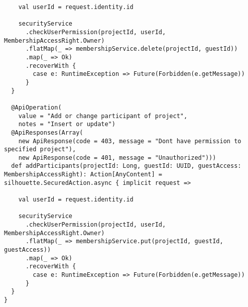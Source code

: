 \begin{lstlisting}
    val userId = request.identity.id

    securityService
      .checkUserPermission(projectId, userId, MembershipAccessRight.Owner)
      .flatMap(_ => membershipService.delete(projectId, guestId))
      .map(_ => Ok)
      .recoverWith {
        case e: RuntimeException => Future(Forbidden(e.getMessage))
      }
  }

  @ApiOperation(
    value = "Add or change participant of project",
    notes = "Insert or update")
  @ApiResponses(Array(
    new ApiResponse(code = 403, message = "Dont have permission to specified project"),
    new ApiResponse(code = 401, message = "Unauthorized")))
  def addParticipants(projectId: Long, guestId: UUID, guestAccess: MembershipAccessRight): Action[AnyContent] = silhouette.SecuredAction.async { implicit request =>

    val userId = request.identity.id

    securityService
      .checkUserPermission(projectId, userId, MembershipAccessRight.Owner)
      .flatMap(_ => membershipService.put(projectId, guestId, guestAccess))
      .map(_ => Ok)
      .recoverWith {
        case e: RuntimeException => Future(Forbidden(e.getMessage))
      }
  }
}
\end{lstlisting}
